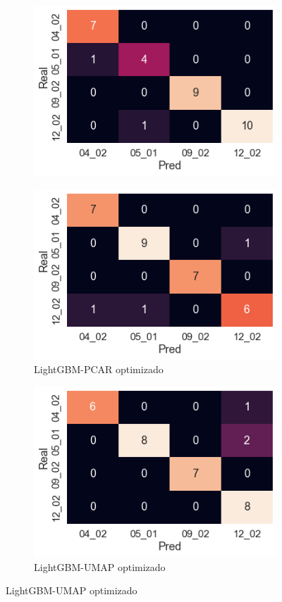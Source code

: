 \documentclass[12pt]{article}
\begin{document}
\begin{figure}[htbp]
\begin{subfigure}[b]{0.35\textwidth}
        \includegraphics[width=\textwidth]{LightGBMopt.png}
    \end{subfigure}
    \begin{subfigure}[b]{0.35\textwidth}
        \caption{LightGBM-PCAR optimizado}
        \includegraphics[width=\textwidth]{LightGBMPCARopt.png}
    \end{subfigure}
    \begin{subfigure}[b]{0.35\textwidth}
        \caption{LightGBM-UMAP optimizado}
        \includegraphics[width=\textwidth]{LightGBMUMAPopt.png}

\end{subfigure}
\end{figure}
\end{document}
